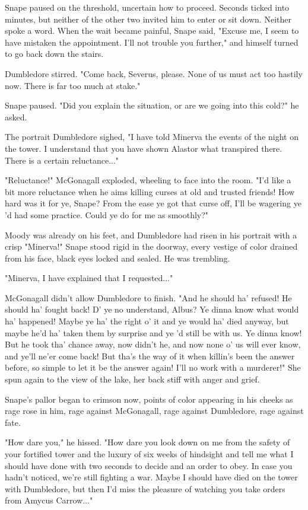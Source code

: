 \documentclass[a4paper,11pt]{article}
\begin{document}
Snape paused on the threshold, uncertain how to proceed. Seconds ticked into minutes, but neither of the other two invited him to enter or sit down. Neither spoke a word. When the wait became painful, Snape said, "Excuse me, I seem to have mistaken the appointment. I'll not trouble you further," and himself turned to go back down the stairs.

Dumbledore stirred. "Come back, Severus, please. None of us must act too hastily now. There is far too much at stake."

Snape paused. "Did you explain the situation, or are we going into this cold?" he asked.

The portrait Dumbledore sighed, "I have told Minerva the events of the night on the tower. I understand that you have shown Alastor what transpired there. There is a certain reluctance..."

"Reluctance!" McGonagall exploded, wheeling to face into the room. "I'd like a bit more reluctance when he aims killing curses at old and trusted friends! How hard was it for ye, Snape? From the ease ye got that curse off, I'll be wagering ye 'd had some practice. Could ye do for me as smoothly?"

Moody was already on his feet, and Dumbledore had risen in his portrait with a crisp "Minerva!" Snape stood rigid in the doorway, every vestige of color drained from his face, black eyes locked and sealed. He was trembling.

"Minerva, I have explained that I requested..."

McGonagall didn't allow Dumbledore to finish. "And he should ha' refused! He should ha' fought back! D' ye no understand, Albus? Ye dinna know what would ha' happened! Maybe ye ha' the right o' it and ye would ha' died anyway, but maybe he'd ha' taken them by surprise and ye 'd still be with us. Ye dinna know! But he took tha' chance away, now didn't he, and now none o' us will ever know, and ye'll ne'er come back! But tha's the way of it when killin's been the answer before, so simple to let it be the answer again! I'll no work with a murderer!" She spun again to the view of the lake, her back stiff with anger and grief.

Snape's pallor began to crimson now, points of color appearing in his cheeks as rage rose in him, rage against McGonagall, rage against Dumbledore, rage against fate.

"How dare you," he hissed. "How dare you look down on me from the safety of your fortified tower and the luxury of six weeks of hindsight and tell me what I should have done with two seconds to decide and an order to obey. In case you hadn't noticed, we're still fighting a war. Maybe I should have died on the tower with Dumbledore, but then I'd miss the pleasure of watching you take orders from Amycus Carrow..."
\end{document}
